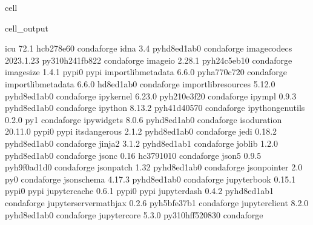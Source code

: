 \documentclass[letterpaper,table,10pt,english]{jupyterBook}
\begin{document}
\begin{sphinxuseclass}{cell}
\begin{sphinxVerbatimOutput}
\begin{sphinxuseclass}{cell_output}
\begin{sphinxVerbatim}[commandchars=\\\{\}]
icu                       72.1                 hcb278e6\PYGZus{}0    conda\PYGZhy{}forge
idna                      3.4                pyhd8ed1ab\PYGZus{}0    conda\PYGZhy{}forge
imagecodecs               2023.1.23       py310h241fb82\PYGZus{}2    conda\PYGZhy{}forge
imageio                   2.28.1             pyh24c5eb1\PYGZus{}0    conda\PYGZhy{}forge
imagesize                 1.4.1                    pypi\PYGZus{}0    pypi
importlib\PYGZhy{}metadata        6.6.0              pyha770c72\PYGZus{}0    conda\PYGZhy{}forge
importlib\PYGZus{}metadata        6.6.0                hd8ed1ab\PYGZus{}0    conda\PYGZhy{}forge
importlib\PYGZus{}resources       5.12.0             pyhd8ed1ab\PYGZus{}0    conda\PYGZhy{}forge
ipykernel                 6.23.0             pyh210e3f2\PYGZus{}0    conda\PYGZhy{}forge
ipympl                    0.9.3              pyhd8ed1ab\PYGZus{}0    conda\PYGZhy{}forge
ipython                   8.13.2             pyh41d4057\PYGZus{}0    conda\PYGZhy{}forge
ipython\PYGZus{}genutils          0.2.0                      py\PYGZus{}1    conda\PYGZhy{}forge
ipywidgets                8.0.6              pyhd8ed1ab\PYGZus{}0    conda\PYGZhy{}forge
isoduration               20.11.0                  pypi\PYGZus{}0    pypi
itsdangerous              2.1.2              pyhd8ed1ab\PYGZus{}0    conda\PYGZhy{}forge
jedi                      0.18.2             pyhd8ed1ab\PYGZus{}0    conda\PYGZhy{}forge
jinja2                    3.1.2              pyhd8ed1ab\PYGZus{}1    conda\PYGZhy{}forge
joblib                    1.2.0              pyhd8ed1ab\PYGZus{}0    conda\PYGZhy{}forge
json\PYGZhy{}c                    0.16                 hc379101\PYGZus{}0    conda\PYGZhy{}forge
json5                     0.9.5              pyh9f0ad1d\PYGZus{}0    conda\PYGZhy{}forge
jsonpatch                 1.32               pyhd8ed1ab\PYGZus{}0    conda\PYGZhy{}forge
jsonpointer               2.0                        py\PYGZus{}0    conda\PYGZhy{}forge
jsonschema                4.17.3             pyhd8ed1ab\PYGZus{}0    conda\PYGZhy{}forge
jupyter\PYGZhy{}book              0.15.1                   pypi\PYGZus{}0    pypi
jupyter\PYGZhy{}cache             0.6.1                    pypi\PYGZus{}0    pypi
jupyter\PYGZhy{}dash              0.4.2              pyhd8ed1ab\PYGZus{}1    conda\PYGZhy{}forge
jupyter\PYGZhy{}server\PYGZhy{}mathjax    0.2.6              pyh5bfe37b\PYGZus{}1    conda\PYGZhy{}forge
jupyter\PYGZus{}client            8.2.0              pyhd8ed1ab\PYGZus{}0    conda\PYGZhy{}forge
jupyter\PYGZus{}core              5.3.0           py310hff52083\PYGZus{}0    conda\PYGZhy{}forge

\end{sphinxVerbatim}
\end{sphinxuseclass}
\end{sphinxVerbatimOutput}
\end{sphinxuseclass}
\end{document}
